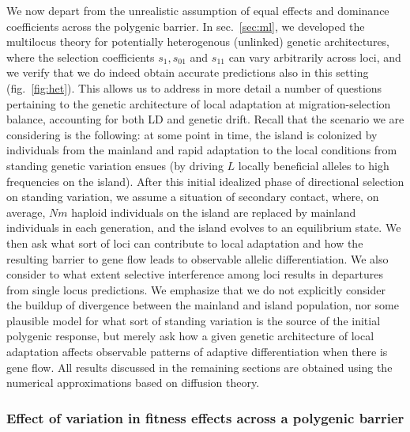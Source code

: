 \documentclass[
  11pt,
]{article}
\begin{document}
We now depart from the unrealistic assumption of equal effects and
dominance coefficients across the polygenic barrier. In
sec.~\ref{sec:ml}, we developed the multilocus theory for potentially
heterogenous (unlinked) genetic architectures, where the selection
coefficients \(s_1, s_{01}\) and \(s_{11}\) can vary arbitrarily across
loci, and we verify that we do indeed obtain accurate predictions also
in this setting (fig.~\ref{fig:het}). This allows us to address in more
detail a number of questions pertaining to the genetic architecture of
local adaptation at migration-selection balance, accounting for both LD
and genetic drift. Recall that the scenario we are considering is the
following: at some point in time, the island is colonized by individuals
from the mainland and rapid adaptation to the local conditions from
standing genetic variation ensues (by driving \(L\) locally beneficial
alleles to high frequencies on the island). After this initial idealized
phase of directional selection on standing variation, we assume a
situation of secondary contact, where, on average, \(Nm\) haploid
individuals on the island are replaced by mainland individuals in each
generation, and the island evolves to an equilibrium state. We then ask
what sort of loci can contribute to local adaptation and how the
resulting barrier to gene flow leads to observable allelic
differentiation. We also consider to what extent selective interference
among loci results in departures from single locus predictions. We
emphasize that we do not explicitly consider the buildup of divergence
between the mainland and island population, nor some plausible model for
what sort of standing variation is the source of the initial polygenic
response, but merely ask how a given genetic architecture of local
adaptation affects observable patterns of adaptive differentiation when
there is gene flow. All results discussed in the remaining sections are
obtained using the numerical approximations based on diffusion theory.

\hypertarget{effect-of-variation-in-fitness-effects-across-a-polygenic-barrier}{%
\subsubsection{Effect of variation in fitness effects across a polygenic
barrier}\label{effect-of-variation-in-fitness-effects-across-a-polygenic-barrier}}
\end{document}
